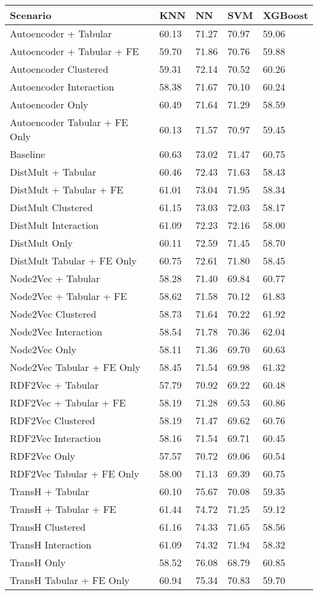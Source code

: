 \begin{tabular}{lllll}
\toprule
Scenario & KNN & NN & SVM & XGBoost \\
\midrule
Autoencoder + Tabular & 60.13 & 71.27 & 70.97 & 59.06 \\
Autoencoder + Tabular + FE & 59.70 & 71.86 & 70.76 & 59.88 \\
Autoencoder Clustered & 59.31 & 72.14 & 70.52 & 60.26 \\
Autoencoder Interaction & 58.38 & 71.67 & 70.10 & 60.24 \\
Autoencoder Only & 60.49 & 71.64 & 71.29 & 58.59 \\
Autoencoder Tabular + FE Only & 60.13 & 71.57 & 70.97 & 59.45 \\
Baseline & 60.63 & 73.02 & 71.47 & 60.75 \\
DistMult + Tabular & 60.46 & 72.43 & 71.63 & 58.43 \\
DistMult + Tabular + FE & 61.01 & 73.04 & 71.95 & 58.34 \\
DistMult Clustered & 61.15 & 73.03 & 72.03 & 58.17 \\
DistMult Interaction & 61.09 & 72.23 & 72.16 & 58.00 \\
DistMult Only & 60.11 & 72.59 & 71.45 & 58.70 \\
DistMult Tabular + FE Only & 60.75 & 72.61 & 71.80 & 58.45 \\
Node2Vec + Tabular & 58.28 & 71.40 & 69.84 & 60.77 \\
Node2Vec + Tabular + FE & 58.62 & 71.58 & 70.12 & 61.83 \\
Node2Vec Clustered & 58.73 & 71.64 & 70.22 & 61.92 \\
Node2Vec Interaction & 58.54 & 71.78 & 70.36 & 62.04 \\
Node2Vec Only & 58.11 & 71.36 & 69.70 & 60.63 \\
Node2Vec Tabular + FE Only & 58.45 & 71.54 & 69.98 & 61.32 \\
RDF2Vec + Tabular & 57.79 & 70.92 & 69.22 & 60.48 \\
RDF2Vec + Tabular + FE & 58.19 & 71.28 & 69.53 & 60.86 \\
RDF2Vec Clustered & 58.19 & 71.47 & 69.62 & 60.76 \\
RDF2Vec Interaction & 58.16 & 71.54 & 69.71 & 60.45 \\
RDF2Vec Only & 57.57 & 70.72 & 69.06 & 60.54 \\
RDF2Vec Tabular + FE Only & 58.00 & 71.13 & 69.39 & 60.75 \\
TransH + Tabular & 60.10 & 75.67 & 70.08 & 59.35 \\
TransH + Tabular + FE & 61.44 & 74.72 & 71.25 & 59.12 \\
TransH Clustered & 61.16 & 74.33 & 71.65 & 58.56 \\
TransH Interaction & 61.09 & 74.32 & 71.94 & 58.32 \\
TransH Only & 58.52 & 76.08 & 68.79 & 60.85 \\
TransH Tabular + FE Only & 60.94 & 75.34 & 70.83 & 59.70 \\
\bottomrule
\end{tabular}
